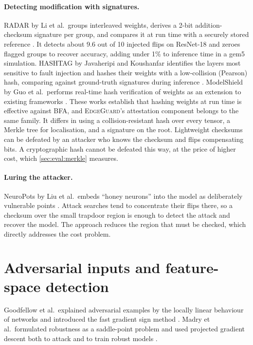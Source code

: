 \paragraph{Detecting modification with signatures.} RADAR by Li et al.\ groups interleaved
weights, derives a 2-bit addition-checksum signature per group, and compares it at run time with
a securely stored reference \cite{li2021radar}. It detects about 9.6 out of 10 injected flips on
ResNet-18 and zeroes flagged groups to recover accuracy, adding under 1\% to inference time in a
gem5 simulation. HASHTAG by Javaheripi and Koushanfar identifies the layers most sensitive to
fault injection and hashes their weights with a low-collision (Pearson) hash, comparing against
ground-truth signatures during inference \cite{javaheripi2021hashtag}. ModelShield by Guo et al.\
performs real-time hash verification of weights as an extension to existing frameworks
\cite{guo2021modelshield}. These works establish that hashing weights at run time is effective
against BFA, and \textsc{EdgeGuard}'s attestation component belongs to the same family. It
differs in using a collision-resistant hash over every tensor, a Merkle tree for localisation,
and a signature on the root. Lightweight checksums can be defeated by an attacker who knows the
checksum and flips compensating bits. A cryptographic hash cannot be defeated this way, at the
price of higher cost, which \cref{sec:eval:merkle} measures.

\paragraph{Luring the attacker.} NeuroPots by Liu et al.\ embeds ``honey neurons'' into the
model as deliberately vulnerable points \cite{liu2023neuropots}. Attack searches tend to
concentrate their flips there, so a checksum over the small trapdoor region is enough to detect
the attack and recover the model. The approach reduces the region that must be checked, which
directly addresses the cost problem.

\section{Adversarial inputs and feature-space detection}
\label{sec:rw:adv}

Goodfellow et al.\ explained adversarial examples by the locally linear behaviour of networks
and introduced the fast gradient sign method \cite{goodfellow2015explaining}. Madry et al.\
formulated robustness as a saddle-point problem and used projected gradient descent both to
attack and to train robust models \cite{madry2018towards}.


